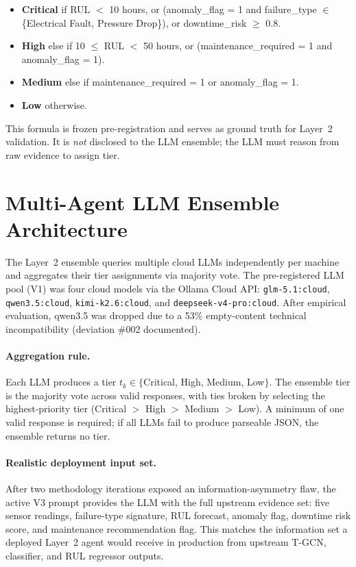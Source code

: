 \begin{itemize}
    \item \textbf{Critical} if RUL $<$ 10 hours, or (anomaly\_flag = 1 and failure\_type $\in$ \{Electrical Fault, Pressure Drop\}), or downtime\_risk $\geq$ 0.8.
    \item \textbf{High} else if 10 $\leq$ RUL $<$ 50 hours, or (maintenance\_required = 1 and anomaly\_flag = 1).
    \item \textbf{Medium} else if maintenance\_required = 1 or anomaly\_flag = 1.
    \item \textbf{Low} otherwise.
\end{itemize}

This formula is frozen pre-registration and serves as ground truth for Layer~2 validation. It is \emph{not} disclosed to the LLM ensemble; the LLM must reason from raw evidence to assign tier.

\section{Multi-Agent LLM Ensemble Architecture}

The Layer~2 ensemble queries multiple cloud LLMs independently per machine and aggregates their tier assignments via majority vote. The pre-registered LLM pool (V1) was four cloud models via the Ollama Cloud API: \texttt{glm-5.1:cloud}, \texttt{qwen3.5:cloud}, \texttt{kimi-k2.6:cloud}, and \texttt{deepseek-v4-pro:cloud}. After empirical evaluation, qwen3.5 was dropped due to a 53\% empty-content technical incompatibility (deviation \#002 documented).

\paragraph{Aggregation rule.} Each LLM produces a tier $t_k \in \{$Critical, High, Medium, Low$\}$. The ensemble tier is the majority vote across valid responses, with ties broken by selecting the highest-priority tier (Critical $>$ High $>$ Medium $>$ Low). A minimum of one valid response is required; if all LLMs fail to produce parseable JSON, the ensemble returns no tier.

\paragraph{Realistic deployment input set.} After two methodology iterations exposed an information-asymmetry flaw, the active V3 prompt provides the LLM with the full upstream evidence set: five sensor readings, failure-type signature, RUL forecast, anomaly flag, downtime risk score, and maintenance recommendation flag. This matches the information set a deployed Layer~2 agent would receive in production from upstream T-GCN, classifier, and RUL regressor outputs.

